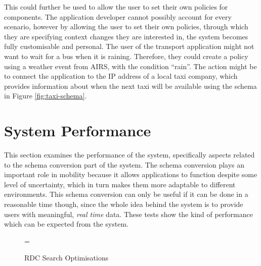 \documentclass[12pt,twoside,notitlepage]{report}
\begin{document}
This could further be used to allow the user to set their own policies for components. 
The application developer cannot possibly account for every scenario, however by allowing the user to set their own policies, through which they are specifying context changes they are interested in, the system becomes fully customisable and personal. 
The user of the transport application might not want to wait for a bus when it is raining. 
Therefore, they could create a policy using a weather event from AIRS, with the condition ``rain''. 
The action might be to connect the application to the IP address of a local taxi company, which provides information about when the next taxi will be available using the schema in Figure \ref{fig:taxi-schema}.





\section{System Performance}

This section examines the performance of the system, specifically aspects related to the schema conversion part of the system. 
The schema conversion plays an important role in mobility because it allows applications to function despite some level of uncertainty, which in turn makes them more adaptable to different environments. 
This schema conversion can only be useful if it can be done in a reasonable time though, since the whole idea behind the system is to provide users with meaningful, {\sl real time} data. 
These tests show the kind of performance which can be expected from the system. 

\begin{figure}[tbh]
\epsfxsize=\hsize
\centerline{}
\caption{RDC Search Optimisations}
\label{fig:rdc_search_optimisations}
\end{figure}
\end{document}
